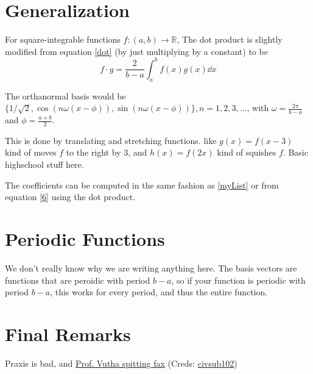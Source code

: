 \documentclass{article}
\newcommand{\R}{\mathbb{R}}
\newcommand{\1}{\mathbbm{1}}
\begin{document}
\section{Generalization}

For square-integrable functions $f:(a,b)\to\R$, The dot product is slightly modified from equation \eqref{dot} (by just multiplying by a constant) to be
\begin{equation}
    f\cdot g=\frac{2}{b-a}\int_a^b f(x)g(x)\dd x
\end{equation}

The orthanormal basis would be
$\{1/\sqrt 2, \cos(n\omega (x-\phi)), \sin(n\omega (x-\phi))\}, n=1,2,3,\dots$, with $\displaystyle{\omega = \frac{2\pi}{b-a}}$ and $\displaystyle{\phi = \frac{a+b}{2}}$.

This is done by translating and stretching functions. like $g(x)=f(x-3)$ kind of moves $f$ to the right by 3, and $h(x)=f(2x)$ kind of squishes $f$. Basic highschool stuff here.

The coefficients can be computed in the same fashion as \ref{myList} or from equation \eqref{6} using the dot product.

\section{Periodic Functions}

We don't really know why we are writing anything here. The basis vectors are functions that are peroidic with period $b-a$, so if your function is periodic with period $b-a$, this works for every period, and thus the entire function.

\section{Final Remarks}
Praxis is bad, and \href{https://www8.physics.utoronto.ca/~vutha/dreadful_dreck.html}{Prof. Vutha spitting fax} (Creds: \href{https://discord.com/channels/701521452662390854/793976446472159272/818334233276841996}{civsub102})
\end{document}
